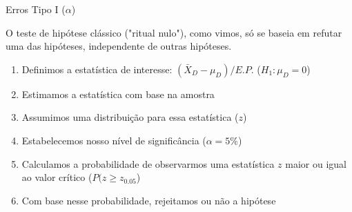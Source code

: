 \documentclass{beamer}\usepackage[]{graphicx}\usepackage[]{color}
\begin{document}
\begin{frame}{Erros Tipo I ($\alpha$)}

O teste de hipótese clássico ("ritual nulo"), como vimos, só se baseia em refutar uma das hipóteses, independente de outras hipóteses.

\begin{enumerate}
  \item Definimos a estatística de interesse: $(\bar{X}_D - \mu_D)/E.P.$ ($H_1: \mu_D = 0$)
  \item Estimamos a estatística com base na amostra
  \item Assumimos uma distribuição para essa estatística ($z$)
  \item Estabelecemos nosso nível de significância ($\alpha = 5\%$)
  \item Calculamos a probabilidade de observarmos uma estatística $z$ maior ou igual ao valor crítico ($P(z \geq z_{0.05}$)
  \item Com base nesse probabilidade, rejeitamos ou não a hipótese
\end{enumerate}

\end{frame}
\end{document}

